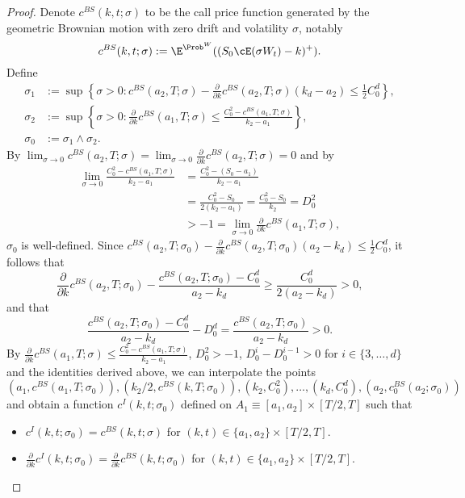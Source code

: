 \documentclass[11pt]{article}
\begin{document}
\begin{proof}
Denote $c^{BS}(k, t; \sigma)$ to be the call price function generated by the geometric Brownian motion with zero drift and volatility $\sigma$, notably
$$
c^{BS}(k, t; \sigma) := \E^{\Prob^W} ((S_0 \cE(\sigma W_t) - k)^+).
$$
Define 
\begin{align*}
\sigma_1 &:= \sup \left\{ \sigma > 0: c^{BS}(a_2, T; \sigma) - \frac{\partial}{\partial k} c^{BS}(a_2, T; \sigma) (k_d-a_2) \leq \frac{1}{2} C^d_0 \right\}, \\
\sigma_2 &:= \sup \left\{ \sigma > 0: \frac{\partial}{\partial k}c^{BS}(a_1, T; \sigma) \leq \frac{C^2_0 - c^{BS}(a_1, T; \sigma)}{k_2 - a_1} \right\}, \\
\sigma_0 &:= \sigma_1 \wedge \sigma_2.
\end{align*}
By $\lim_{\sigma \to 0} c^{BS}(a_2, T; \sigma) = \lim_{\sigma \to 0} \frac{\partial}{\partial k} c^{BS}(a_2, T; \sigma) = 0$ and by 
\begin{align*}
\lim_{\sigma \to 0} \frac{C^2_0 - c^{BS}(a_1,T; \sigma)}{k_2 - a_1} &= \frac{C^2_0 - (S_0 - a_1)}{k_2 - a_1} \\
&= \frac{C^2_0 - S_0}{2(k_2 - a_1)} = \frac{C^2_0 - S_0}{k_2} = D^2_0 \\
&> -1 = \lim_{\sigma \to 0} \frac{\partial}{\partial k} c^{BS}(a_1, T; \sigma),
\end{align*}
$\sigma_0$ is well-defined. Since $c^{BS}(a_2, T; \sigma_0) - \frac{\partial}{\partial k} c^{BS}(a_2, T; \sigma_0) (a_2-k_d) \leq \frac{1}{2} C^d_0$, it follows that
$$
\frac{\partial}{\partial k} c^{BS}(a_2, T; \sigma_0) - \frac{c^{BS}(a_2, T; \sigma_0) - C^d_0}{a_2 - k_d} \geq \frac{C^d_0}{2(a_2 - k_d)} > 0,
$$
and that
$$
\frac{c^{BS}(a_2, T; \sigma_0) - C^d_0}{a_2 - k_d} - D^d_0 = \frac{c^{BS}(a_2, T; \sigma_0)}{a_2 - k_d} > 0.
$$
By $\frac{\partial}{\partial k}c^{BS}(a_1, T; \sigma) \leq \frac{C^2_0 - c^{BS}(a_1, T; \sigma)}{k_2 - a_1}$, $D^2_0 > -1$, $D^i_0 - D^{i-1}_0 > 0$ for $i \in \{3,\ldots,d\}$ and the identities derived above, we can interpolate the points 
$$
(a_1, c^{BS}(a_1, T; \sigma_0)), (k_2/2,c^{BS}(k, T; \sigma_0)), (k_2, C^2_0), \ldots, (k_d, C^d_0), (a_2, c^{BS}_0(a_2; \sigma_0))
$$
and obtain a function $c^{I}(k, t; \sigma_0)$ defined on $A_1 \equiv [a_1, a_2] \times [T/2, T]$ such that
\begin{itemize}
\item $c^{I}(k,t; \sigma_0) = c^{BS}(k,t; \sigma)$ for $(k,t) \in \{a_1, a_2\} \times [T/2, T]$.
\item $\frac{\partial}{\partial k} c^{I}(k, t; \sigma_0) = \frac{\partial}{\partial k} c^{BS}(k, t; \sigma_0)$ for $(k,t) \in \{a_1, a_2\} \times [T/2, T]$.

\end{itemize}
\end{proof}
\end{document}
